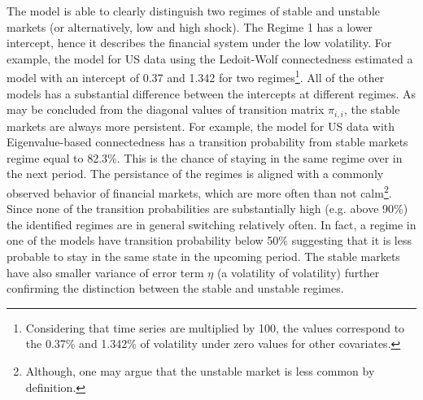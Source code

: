 \documentclass[12pt]{article}
\begin{document}
The model is able to clearly distinguish two regimes of stable and unstable markets (or alternatively, low and high shock). The Regime 1 has a lower intercept, hence it describes the financial system under the low volatility.   For example, the model for US data using the Ledoit-Wolf connectedness estimated a model with an intercept of 0.37 and 1.342 for two regimes\footnote{Considering that time series are multiplied by 100, the values correspond to the 0.37\% and 1.342\% of volatility under zero values for other covariates.}. All of the other models has a substantial difference between the intercepts at different regimes. As may be concluded from the diagonal values of transition matrix $\pi_{i,i}$, the stable markets are always more persistent. For example, the model for US data with Eigenvalue-based connectedness has a transition probability from stable markets regime equal to 82.3\%. This is the chance of staying in the same regime over in the next period. The persistance of the regimes is aligned with a commonly observed behavior of financial markets, which are more often than not calm\footnote{Although, one may argue that the unstable market is less common by definition.}. Since none of the transition probabilities are substantially high (e.g. above 90\%) the identified regimes are in general switching relatively often. In fact, a regime in one of the models have transition probability below 50\% suggesting that it is less probable to stay in the same state in the upcoming period. The stable markets have also smaller variance of error term $\eta$ (a volatility of volatility) further confirming the distinction between the stable and unstable regimes.
\end{document}
